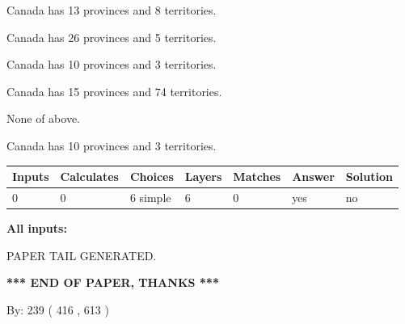 \documentclass[12pt]{article}
\begin{document}
 
Canada has  13 provinces and  8 territories.
 
 
Canada has  26 provinces and  5 territories.
 
 
Canada has 10  provinces and 3 territories.
 
 
Canada has  15 provinces and  74 territories.
 
 
 None of above.
 
 
\noindent{}
 
 
Canada has 10  provinces and 3 territories.
 
 
\noindent{}
 
 
   
   
   
   
\noindent\begin{tabular}{|l|l|l|l|l|l|l|}
 \hline
Inputs & Calculates & Choices & Layers & Matches & Answer & Solution \\ \hline
 0  & 
 0  & 
 6
  simple  
  & 
 6  & 
 0  & 
  yes & 
  no 
  \\ \hline
 \end{tabular}
   
   
   
   
\noindent{}
   
   
   
   
\noindent\vspace{0.1in}\hspace{-0.08in} {\textbf{\Large{All inputs: }}}
   
   
   
   
   
   
 \vspace{0.2in}
 
   
   
\vspace{2.0in} PAPER TAIL GENERATED.
   
   
   
   
\vspace{1.0in} 
{\textbf{\large{ *** END OF PAPER, THANKS *** }}} 
   
   
\hspace{1.0in} By: 
 239 ( 416 ,  613 )
   
\end{document}
